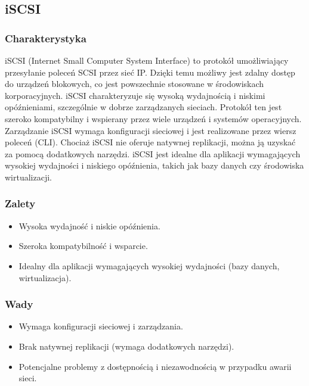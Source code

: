 \documentclass[polish,envcountsect,10pt]{article}
\begin{document}
\subsection{iSCSI}

\subsubsection{Charakterystyka}

iSCSI (Internet Small Computer System Interface) to protokół umożliwiający przesyłanie poleceń SCSI przez sieć IP. Dzięki temu możliwy jest zdalny dostęp do urządzeń blokowych, co jest powszechnie stosowane w środowiskach korporacyjnych. iSCSI charakteryzuje się wysoką wydajnością i niskimi opóźnieniami, szczególnie w dobrze zarządzanych sieciach. Protokół ten jest szeroko kompatybilny i wspierany przez wiele urządzeń i systemów operacyjnych. Zarządzanie iSCSI wymaga konfiguracji sieciowej i jest realizowane przez wiersz poleceń (CLI). Chociaż iSCSI nie oferuje natywnej replikacji, można ją uzyskać za pomocą dodatkowych narzędzi. iSCSI jest idealne dla aplikacji wymagających wysokiej wydajności i niskiego opóźnienia, takich jak bazy danych czy środowiska wirtualizacji.

\subsubsection{Zalety}

\begin{itemize}
    \item Wysoka wydajność i niskie opóźnienia.
    \item Szeroka kompatybilność i wsparcie.
    \item Idealny dla aplikacji wymagających wysokiej wydajności (bazy danych, wirtualizacja).
\end{itemize}

\subsubsection{Wady}

\begin{itemize}
    \item Wymaga konfiguracji sieciowej i zarządzania.
    \item Brak natywnej replikacji (wymaga dodatkowych narzędzi).
    \item Potencjalne problemy z dostępnością i niezawodnością w przypadku awarii sieci.
\end{itemize}
\end{document}
